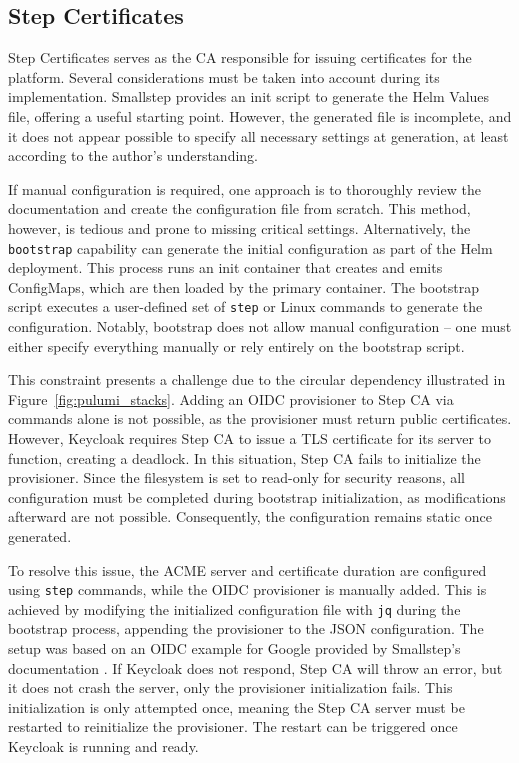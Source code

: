 \subsection{Step Certificates}
Step Certificates serves as the CA responsible for issuing certificates for the platform. Several considerations must be taken into account during its implementation. Smallstep provides an init script to generate the Helm Values file, offering a useful starting point. However, the generated file is incomplete, and it does not appear possible to specify all necessary settings at generation, at least according to the author's understanding.

If manual configuration is required, one approach is to thoroughly review the documentation and create the configuration file from scratch. This method, however, is tedious and prone to missing critical settings. Alternatively, the \texttt{bootstrap} capability can generate the initial configuration as part of the Helm deployment. This process runs an init container that creates and emits ConfigMaps, which are then loaded by the primary container. The bootstrap script executes a user-defined set of \texttt{step} or Linux commands to generate the configuration. Notably, bootstrap does not allow manual configuration -- one must either specify everything manually or rely entirely on the bootstrap script.

This constraint presents a challenge due to the circular dependency illustrated in Figure~\ref{fig:pulumi_stacks}. Adding an OIDC provisioner to Step CA via commands alone is not possible, as the provisioner must return public certificates. However, Keycloak requires Step CA to issue a TLS certificate for its server to function, creating a deadlock. In this situation, Step CA fails to initialize the provisioner. Since the filesystem is set to read-only for security reasons, all configuration must be completed during bootstrap initialization, as modifications afterward are not possible. Consequently, the configuration remains static once generated.

To resolve this issue, the ACME server and certificate duration are configured using \texttt{step} commands, while the OIDC provisioner is manually added. This is achieved by modifying the initialized configuration file with \texttt{jq} during the bootstrap process, appending the provisioner to the JSON configuration. The setup was based on an OIDC example for Google provided by Smallstep's documentation \parencite{smallstep_google_identity}. If Keycloak does not respond, Step CA will throw an error, but it does not crash the server, only the provisioner initialization fails. This initialization is only attempted once, meaning the Step CA server must be restarted to reinitialize the provisioner. The restart can be triggered once Keycloak is running and ready.


